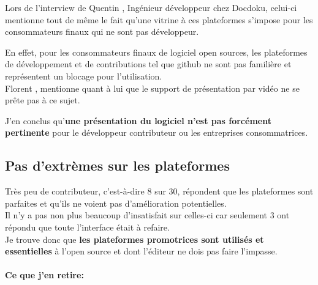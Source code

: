 			Lors de l'interview de Quentin , Ingénieur développeur chez Docdoku, celui-ci mentionne tout de même le fait qu'une vitrine à ces plateformes s'impose pour les consommateurs finaux qui ne sont pas développeur.

			\begin{center}
				\textit{
				}
			\end{center}

			En effet, pour les consommateurs finaux de logiciel open sources, les plateformes de développement et de contributions tel que github ne sont pas familière et représentent un blocage pour l'utilisation.\\

			Florent , mentionne quant à lui que le support de présentation par vidéo ne se prête pas à ce sujet.

			\begin{center}
				\textit{
				}
			\end{center}

			J'en conclus qu'\textbf{une présentation du logiciel n'est pas forcément pertinente} pour le développeur contributeur ou les entreprises consommatrices.

		\subsection{Pas d'extrèmes sur les plateformes}

			Très peu de contributeur, c'est-à-dire 8 sur 30, répondent que les plateformes sont parfaites et qu'ils ne voient pas d'amélioration potentielles.\\

			Il n'y a pas non plus beaucoup d'insatisfait sur celles-ci car seulement 3 ont répondu que toute l'interface était à refaire.\\

			Je trouve donc que \textbf{les plateformes promotrices sont utilisés et essentielles} à l'open source et dont l'éditeur ne dois pas faire l'impasse.

		\paragraph{Ce que j'en retire:\\}

